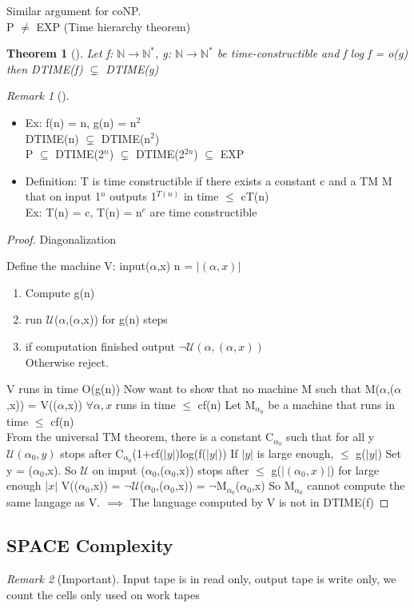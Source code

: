 \documentclass{article}
\newtheorem{theorem}{Theorem}
\theoremstyle{definition}
\theoremstyle{remark}
\newtheorem*{remark}{Remark}
\newcommand{\Thm}[3]{\begin{theorem}[#1]\label{#2}#3\end{theorem}}
\newcommand{\Rem}[3]{\begin{remark}[#1]\label{#2}#3\end{remark}}
\newcommand{\Proof}[1]{\begin{proof}#1\end{proof}}
\newcommand{\N}{\mathbb{N}}
\begin{document}
Similar argument for coNP.\\

P $\neq$ EXP (Time hierarchy theorem)
\Thm{}{}{Let f: $\N \rightarrow \N^*$, g: $\N \rightarrow \N^*$ be time-constructible and f log f = o(g) then DTIME(f) $\subsetneq$ DTIME(g)}

\Rem{}{}{\begin{itemize}
		\item Ex: f(n) = n, g(n) = n$^2$\\
		DTIME(n) $\subsetneq$ DTIME(n$^2$)\\
		P $\subseteq$ DTIME(2$^n$) $\subsetneq$ DTIME(2$^{2n}$) $\subseteq$ EXP
		\item Definition: T is time constructible if there exists a constant c and a TM M that on input 1$^n$ outputs 1$^{T(n)}$ in time $\leq$ cT(n)\\
		Ex: T(n) = c, T(n) = n$^c$ are time constructible
	\end{itemize}}
\Proof{Diagonalization
	
	Define the machine V: input($\alpha$,x) n = $|(\alpha,x)|$
	\begin{enumerate}
		\item Compute g(n)
		\item run $\mathcal{U}$($\alpha$,($\alpha$,x)) for g(n) steps
		\item if computation finished output $\neg\mathcal{U}(\alpha,(\alpha,x))$\\
		Otherwise reject.
	\end{enumerate}
	V runs in time O(g(n))
	Now want to show that no machine M such that M($\alpha$,($\alpha$,x)) = V(($\alpha$,x)) $\forall\alpha,x$ runs in time $\leq$ cf(n)
	Let M$_{\alpha_0}$ be a machine that runs in time $\leq$ cf(n)\\
	From the universal TM theorem, there is a constant C$_{\alpha_0}$ such that for all y\\
	$\mathcal{U}(\alpha_0,y)$ stops after C$_{\alpha_0}$(1+cf($|y|$)log(f($|y|$))
	If $|y|$ is large enough, $\leq$ g($|y|$)
	Set y = ($\alpha_0$,x). So $\mathcal{U}$ on imput ($\alpha_0$,($\alpha_0$,x)) stops after $\leq$ g($|(\alpha_0,x)|$) for large enough $|x|$
	V(($\alpha_0$,x)) = $\neg\mathcal{U}$($\alpha_0$,($\alpha_0$,x)) = $\neg$M$_{\alpha_0}$($\alpha_0$,x)
	So M$_{\alpha_0}$ cannot compute the same langage as V. $\implies$ The language computed by V is not in DTIME(f)}

\subsection{SPACE Complexity}
\Rem{Important}{}{Input tape is in read only, output tape is write only, we count the cells only used on work tapes}
\end{document}
